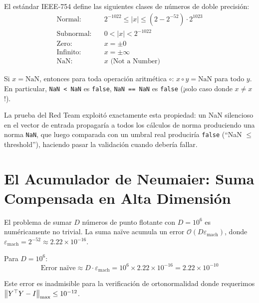 \begin{definition}
El estándar IEEE-754 define las siguientes clases de números de doble precisión:
\begin{align}
\text{Normal:} &\quad 2^{-1022} \le |x| \le (2 - 2^{-52}) \cdot 2^{1023} \\
\text{Subnormal:} &\quad 0 < |x| < 2^{-1022} \\
\text{Zero:} &\quad x = \pm 0 \\
\text{Infinito:} &\quad x = \pm\infty \\
\text{NaN:} &\quad x \text{ (Not a Number)}
\end{align}
\end{definition}

\begin{theorem}
Si $x = \text{NaN}$, entonces para toda operación aritmética $\circ$:
$x \circ y = \text{NaN}$ para todo $y$. En particular, \texttt{NaN < NaN} es
\texttt{false}, \texttt{NaN == NaN} es \texttt{false} (¡solo caso donde $x \ne x$!).
\end{theorem}

La prueba del Red Team exploitó exactamente esta propiedad: un NaN silencioso
en el vector de entrada propagaría a todos los cálculos de norma produciendo
una norma \texttt{NaN}, que luego comparada con un umbral real produciría
\texttt{false} (``NaN $\le$ threshold''), haciendo pasar la validación cuando
debería fallar.

\section{El Acumulador de Neumaier: Suma Compensada en Alta Dimensión}

El problema de sumar $D$ números de punto flotante con $D = 10^6$ es
numéricamente no trivial. La suma naïve acumula un error $\mathcal{O}(D\varepsilon_{\text{mach}})$,
donde $\varepsilon_{\text{mach}} = 2^{-52} \approx 2.22 \times 10^{-16}$.

Para $D = 10^6$:
\begin{equation}
\text{Error naïve} \approx D \cdot \varepsilon_{\text{mach}} = 10^6 \times 2.22 \times 10^{-16} = 2.22 \times 10^{-10}
\end{equation}

Este error es inadmisible para la verificación de ortonormalidad donde requerimos
$\norm{Y^\top Y - I}_{\max} \le 10^{-12}$.

